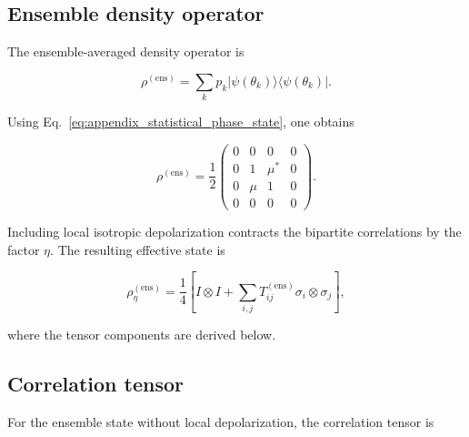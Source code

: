 
\subsection*{Ensemble density operator}

The ensemble-averaged density operator is

\begin{equation}
\rho^{(\mathrm{ens})}
=
\sum_k
p_k
|\psi(\theta_k)\rangle
\langle
\psi(\theta_k)|.
\label{eq:appendix_ensemble_density_operator}
\end{equation}

Using Eq.~\eqref{eq:appendix_statistical_phase_state}, one obtains

\begin{equation}
\rho^{(\mathrm{ens})}
=
\frac12
\begin{pmatrix}
0 & 0 & 0 & 0
\\
0 & 1 & \mu^* & 0
\\
0 & \mu & 1 & 0
\\
0 & 0 & 0 & 0
\end{pmatrix}.
\label{eq:appendix_ensemble_density_matrix}
\end{equation}

\medskip

Including local isotropic depolarization contracts the bipartite correlations by the factor \( \eta \). The resulting effective state is

\begin{equation}
\rho_{\eta}^{(\mathrm{ens})}
=
\frac14
\left[
I\otimes I
+
\sum_{i,j}
T_{ij}^{(\mathrm{ens})}
\sigma_i\otimes\sigma_j
\right],
\label{eq:appendix_composite_ensemble_state}
\end{equation}

where the tensor components are derived below.


\subsection*{Correlation tensor}

For the ensemble state without local depolarization, the correlation tensor is

